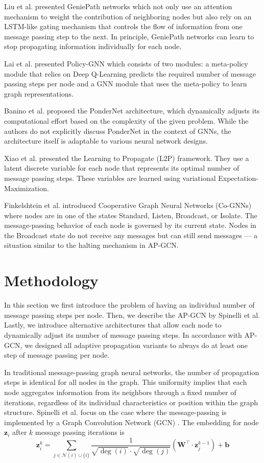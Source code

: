\documentclass{gdl}
\begin{document}
Liu et al. \cite{liu2019} presented GeniePath networks which not only use an attention mechanism to weight the contribution of neighboring nodes but also rely on an LSTM-like gating mechanism that controls the flow of information from one message passing step to the next. In principle, GeniePath networks can learn to stop propagating information individually for each node.

Lai et al. \cite{lai2020} presented Policy-GNN which consists of two modules: a meta-policy module that relies on Deep Q-Learning predicts the required number of message passing steps per node and a GNN module that uses the meta-policy to learn graph representations.

Banino et al. \cite{banino2021} proposed the PonderNet architecture, which dynamically adjusts its computational effort based on the complexity of the given problem. While the authors do not explicitly discuss PonderNet in the context of GNNs, the architecture itself is adaptable to various neural network designs.

Xiao et al. \cite{xiao2021} presented the Learning to Propagate (L2P) framework. They use a latent discrete variable for each node that represents its optimal number of message passing steps. These variables are learned using variational Expectation-Maximization.

Finkelshtein et al. \cite{finkelshtein2024} introduced Cooperative Graph Neural Networks (Co-GNNs) where nodes are in one of the states Standard, Listen, Broadcast, or Isolate. The message-passing behavior of each node is governed by its current state. Nodes in the Broadcast state do not receive any messages but can still send messages — a situation similar to the halting mechanism in AP-GCN.

\section{Methodology}
In this section we first introduce the problem of having an individual number of message passing steps per node. Then, we describe the AP-GCN by Spinelli et al. Lastly, we introduce alternative architectures that allow each node to dynamically adjust its number of message passing steps. In accordance with AP-GCN, we designed all adaptive propagation variants to always do at least one step of message passing per node.

In traditional message-passing graph neural networks, the number of propagation steps is identical for all nodes in the graph. This uniformity implies that each node aggregates information from its neighbors through a fixed number of iterations, regardless of its individual characteristics or position within the graph structure. Spinelli et al. focus on the case where the message-passing is implemented by a Graph Convolution Network (GCN) \cite{kipf2017}. The embedding for node $\mathbf{z}_i$ after $k$ message passing iterations is
\begin{equation}
\mathbf{z}_i^{k} = \sum_{j \in \mathcal{N}(i) \cup \{i\}} \frac{1}{\sqrt{\deg(i)} \cdot \sqrt{\deg(j)}} \left( \mathbf{W}^\top \cdot \mathbf{z}_j^{k-1} \right) + \mathbf{b}
\end{equation}
\end{document}
